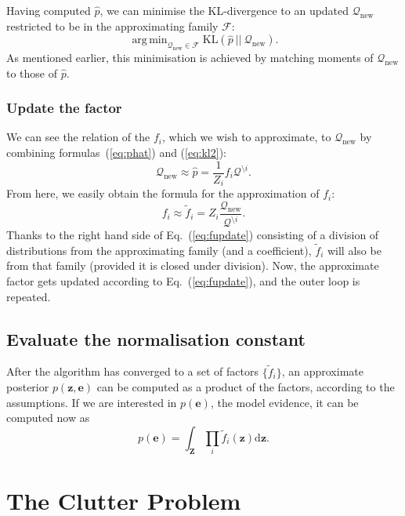 \documentclass[11pt]{article}
\newcommand{\vek}[1]{\ensuremath{\mathbf{#1}}}
\newcommand{\kve}{\ensuremath{\mathcal{Q}}}
\newcommand{\byd}{\ensuremath{\mathrm{d}}}
\newcommand{\KL}[2]{\ensuremath{\text{KL}(#1\:||\:#2)}}
\DeclareMathOperator*{\argmin}{arg\,min}
\newcommand{\oldss}{\thesubsection}
\newcommand{\oldsss}{\thesubsubsection}
\begin{document}
Having computed $\hat{p}$, we can minimise the KL-divergence to an updated 
$\kve_{\text{new}}$ restricted to be in the approximating family 
$\mathcal{F}$:
\begin{equation}
	\argmin_{\kve_{\text{new}}\in\mathcal{F}}%
		\KL{\hat{p}}{\kve_{\text{new}}}.
	\label{eq:kl2}
\end{equation}
As mentioned earlier, this minimisation is achieved by matching moments of 
$\kve_{\text{new}}$ to those of $\hat{p}$.

\subsubsection{Update the factor}
We can see the relation of the $f_i$, which we wish to approximate, to 
$\kve_{\text{new}}$ by combining formulas~(\ref{eq:phat}) and 
(\ref{eq:kl2}):
\begin{equation}
	\kve_{\text{new}} \approx \hat{p} = \frac{1}{Z_i}f_i\kve^{\setminus i}.
\end{equation}
From here, we easily obtain the formula for the approximation of $f_i$:
\begin{equation}
	f_i \approx \tilde{f}_i = Z_i\frac{\kve_{\text{new}}}{\kve^{\setminus 
	i}}.
	\label{eq:fupdate}
\end{equation}
Thanks to the right hand side of Eq.~(\ref{eq:fupdate}) consisting of 
a division of distributions from the approximating family (and 
a coefficient), $\tilde{f}_i$ will also be from that family (provided it is 
closed under division).  Now, the approximate factor gets updated according 
to Eq.~(\ref{eq:fupdate}), and the outer loop is repeated.

\subsection{Evaluate the normalisation constant}
After the algorithm has converged to a set of factors $\{\tilde{f}_i\}$, an 
approximate posterior $p(\vek{z}, \vek{e})$ can be computed as a product of 
the factors, according to the assumptions. If we are interested in 
$p(\vek{e})$, the model evidence, it can be computed now as
\begin{equation}
	p(\vek{e}) = \int_{\vek{Z}} \prod_i\tilde{f}_i(\vek{z}) \byd\vek{z}.
	\label{eq:normaliser}
\end{equation}

\renewcommand{\thesubsection}{\oldss}
\renewcommand{\thesubsubsection}{\oldsss}

\section{The Clutter Problem}
\label{sec:clutter}
\end{document}
